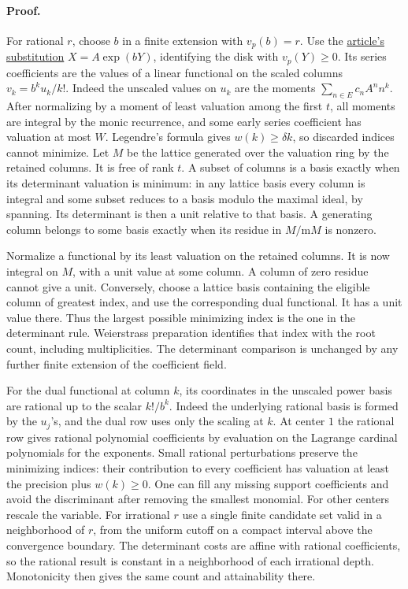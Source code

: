 \documentclass[11pt]{article}
\begin{document}
\paragraph{Proof.}
For rational \(r\), choose \(b\) in a finite extension with \(v_p(b)=r\).
Use the \href{https://github.com/VladimirReshetnikov/ProveIt/blob/dd990b27a22290c756c1bd4adce1d971bf7e7821/Analysis/GeneralizedRiemannHypothesis/Article/sections/smd.tex#L57}{article's substitution}
\(X=A\exp(bY)\), identifying the disk with \(v_p(Y)\ge0\).
Its series coefficients are the values of a linear functional on
the scaled columns \(v_k=b^ku_k/k!\). Indeed the unscaled values
on \(u_k\) are the moments \(\sum_{n\in E}c_n A^n n^k\).
After normalizing by a moment of least valuation among the first \(t\),
all moments are integral by the monic recurrence, and some early
series coefficient has valuation at most \(W\). Legendre's formula
gives \(w(k)\ge\delta k\), so discarded indices cannot minimize.
\newpage
Let \(M\) be the lattice generated over the valuation ring by the
retained columns. It is free of rank \(t\).
A subset of columns is a basis exactly when its determinant valuation
is minimum: in any lattice basis every column is integral and some
subset reduces to a basis modulo the maximal ideal, by spanning.
Its determinant is then a unit relative to that basis.
A generating column belongs to some basis exactly when its residue
in \(M/\mathrm m M\) is nonzero.

Normalize a functional by its least valuation on the retained
columns. It is now integral on \(M\), with a unit value at some
column. A column of zero residue cannot give a unit.
Conversely, choose a lattice basis containing the eligible column
of greatest index, and use the corresponding dual functional.
It has a unit value there. Thus the largest possible minimizing index
is the one in the determinant rule. Weierstrass preparation identifies
that index with the root count, including multiplicities.
The determinant comparison is unchanged by any further finite
extension of the coefficient field.

For the dual functional at column \(k\), its coordinates in the
unscaled power basis are rational up to the scalar \(k!/b^k\).
Indeed the underlying rational basis is formed by the \(u_j\)'s,
and the dual row uses only the scaling at \(k\).
At center \(1\) the rational row gives rational polynomial
coefficients by evaluation on the Lagrange cardinal polynomials for
the exponents. Small rational perturbations preserve the minimizing
indices: their contribution to every coefficient has valuation
at least the precision plus \(w(k)\ge0\). One can fill any missing
support coefficients and avoid the discriminant after removing
the smallest monomial. For other centers rescale the variable.
For irrational \(r\) use a single finite candidate set valid in a
neighborhood of \(r\), from the uniform cutoff on a compact interval
above the convergence boundary. The determinant costs are
affine with rational coefficients, so the rational result is constant
in a neighborhood of each irrational depth. Monotonicity then gives
the same count and attainability there.
\end{document}
